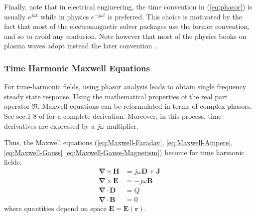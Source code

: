 Finally, note that in electrical engineering, the time convention in (\ref{eq:phasor}) is usually $e^{j\omega t}$ while in physics $e^{-j\omega t}$ is preferred\parencite{Bradley2007, Michelsen2017}. This choice is motivated by the fact that most of the electromagnetic solver packages use the former convention, and so to avoid any confusion. Note however that most of the physics books on plasma waves adopt instead the later convention \parencite{Swanson2003, Stix1992, Brambilla1998}.




\subsubsection{Time Harmonic Maxwell Equations}
For time-harmonic fields, using phasor analysis leads to obtain single frequency steady state response. Using the mathematical properties of the real part operator $\Re$, Maxwell equations can be reformulated in terms of complex phasors. See sec.1-8 of \parencite{Harrington2001} for a complete derivation. Moreover, in this process, time-derivatives are expressed by a $j\omega$ multiplier.  

Thus, the Maxwell equations (\ref{eq:Maxwell-Faraday}, \ref{eq:Maxwell-Ampere}, \ref{eq:Maxwell-Gauss} \ref{eq:Maxwell-Gauss-Magnetism}) become for time harmonic fields:
\begin{subequations}
 \begin{align}
  \boldsymbol{\nabla} \times \mathbf{H} &= j\omega\mathbf{D} + \mathbf{J}  \label{eq:Maxwell-Faraday-Harmonic} \\
  \boldsymbol{\nabla} \times \mathbf{E} &= -j\omega\mathbf{B} \label{eq:Maxwell-Ampere-Harmonic} \\
  \boldsymbol{\nabla} \cdot \mathbf{D} &= Q \label{eq:Maxwell-Gauss-Harmonic} \\
  \boldsymbol{\nabla} \cdot \mathbf{B} &= 0 \label{eq:Maxwell-Gauss-Magnetism-Harmonic} 
 \end{align}
 \label{eq:MaxwellEquationsTimeHarmonic}
\end{subequations}
where quantities depend on space $\mathbf{E}=\mathbf{E(\mathbf{r})}$. 


